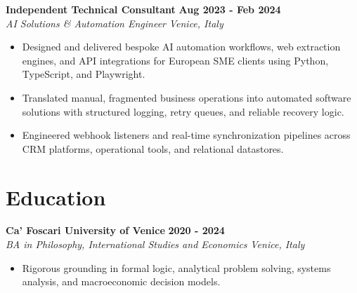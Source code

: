 \documentclass[10pt,a4paper]{article}
\newcommand{\role}[4]{%
  \textbf{#1} \hfill \textbf{#2}\\[1pt]%
  \textit{#3} \hfill \textit{#4}\\[2pt]%
}
\begin{document}
\role{Independent Technical Consultant}{Aug 2023 - Feb 2024}{AI Solutions \&  Automation Engineer}{Venice, Italy}
\begin{itemize}
  \item Designed and delivered bespoke AI automation workflows, web extraction engines, and API integrations for European SME clients using Python, TypeScript, and Playwright.
  \item Translated manual, fragmented business operations into automated software solutions with structured logging, retry queues, and reliable recovery logic.
  \item Engineered webhook listeners and real-time synchronization pipelines across CRM platforms, operational tools, and relational datastores.
\end{itemize}

\section{Education}
\role{Ca' Foscari University of Venice}{2020 - 2024}{BA in Philosophy, International Studies and Economics}{Venice, Italy}
\begin{itemize}
  \item Rigorous grounding in formal logic, analytical problem solving, systems analysis, and macroeconomic decision models.
\end{itemize}
\end{document}
